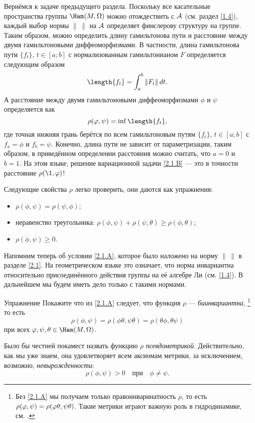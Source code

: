 Вернёмся к задаче предыдущего раздела.
Поскольку все касательные пространства группы $\Ham(M, \Omega)$ можно
отождествить с $\mathcal{A}$ (см. раздел \ref{1.4}), каждый выбор нормы
$\|\ \|$ на $\mathcal{A}$ определяет финслерову структуру на группе.
Таким образом, можно определить длину гамильтонова пути и расстояние между двумя гамильтоновыми диффеоморфизмами.
В частности, длина гамильтонова пути $\{f_t\}$, $t \in [a; b]$ с нормализованным гамильтонианом $F$ определяется следующим образом 
\[\length\{f_t\}=\int_a^b \| F_t \|\,dt.\]
А расстояние между двумя гамильтоновыми диффеоморфизмами $\phi$ и $\psi$ определяется как \index[symb]{$\rho$}
\[\rho (\phi, \psi) = \inf \length \{f_t\},\] 
где точная нижняя грань берётся по всем гамильтоновым путям $\{f_t\}$, $t \in [a; b]$ с $f_a = \phi$ и $f_b = \psi$.
Конечно, длина пути не зависит от параметризации, таким образом, в приведённом определении расстояния можно считать, что $a = 0$ и $b = 1$.
На этом языке, решение вариационной задачи
\ref{2.1.B} — это в точности расстояние $\rho (\1, \phi)$!

Следующие свойства $\rho$ легко проверить,
они даются как упражнения:
\begin{itemize}
\item $\rho (\phi, \psi) = \rho (\psi, \phi)$;
\item неравенство треугольника: $\rho (\phi, \psi) + \rho (\psi, \theta) \ge \rho (\phi, \theta)$;
\item $\rho (\phi, \psi) \ge 0$.
\end{itemize}

Напомним теперь об условии \ref{2.1.A}, которое было наложено на норму $\|\ \|$ в разделе \ref{2.1}.
На геометрическом языке это означает, что норма инвариантна относительно присоединённого действия группы на её алгебре Ли (см. \ref{1.4}).
В дальнейшем мы будем иметь дело только с такими нормами.

\begin{ex*}{Упражнение}
Покажите что из \ref{2.1.A} следует, что функция $\rho$ — \emph{биинвариантна},%
\footnote{Без \ref{2.1.A} мы получаем только правоинваринатность $\rho$, то есть $\rho (\phi, \psi) \z= \rho (\phi\theta, \psi\theta)$.
Такие метрики играют важную роль в гидродинамике, см. \cite{AK}.}
то есть
\[\rho (\phi, \psi) = \rho (\phi \theta, \psi \theta) = \rho (\theta\phi, \theta\psi)\]
при всех $\phi, \psi, \theta \in \Ham (M, \Omega)$.
\end{ex*}

Было бы честней покамест назвать функцию $\rho$ \emph{псевдометрикой}.
Действительно, как мы уже знаем, она удовлетворяет всем аксиомам метрики, за исключением, возможно, {}\emph{невырожденности}: 
\begin{equation}
\rho (\phi, \psi)> 0
\quad\text{при}\quad
\phi \ne \psi.
\label{eq:2.2.A}
\end{equation}


